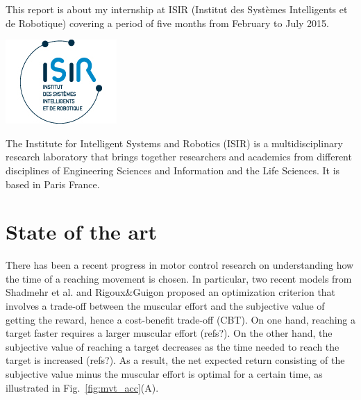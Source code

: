 \documentclass[pdftex,a4paper,11pt]{report}
\begin{document}
This report is about my internship at ISIR (Institut des Systèmes Intelligents et de Robotique) covering a period of five months from February to July 2015.
\linebreak 
\linebreak
\linebreak
\begin{minipage}{0.49\textwidth}
	\includegraphics[]{images/logo_isir.jpg}
\end{minipage}
\begin{minipage}{0.49\textwidth}
	The Institute for Intelligent Systems and Robotics (ISIR) is a multidisciplinary research laboratory that brings together researchers and academics from different disciplines of Engineering Sciences and Information and the Life Sciences. It is based in Paris France.
\end{minipage}

\pagebreak

\section{State of the art}

There has been a recent progress in motor control research on understanding how the time of a reaching movement is chosen. In particular, two recent models from Shadmehr et al. \cite{shadmehr10} and Rigoux\&Guigon \cite{rigoux12} proposed an optimization criterion that involves a trade-off between the muscular effort and the subjective value of getting the reward, hence a cost-benefit trade-off (CBT).
On one hand, reaching a target faster requires a larger muscular effort (refs?). On the other hand, the subjective value of reaching a target decreases as the time needed to reach the target is increased (refs?). As a result, the net expected return consisting of the subjective value minus the muscular effort is optimal for a certain time, as illustrated in Fig.~\ref{fig:mvt_acc}(A).
\end{document}
